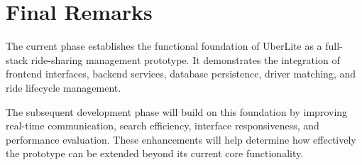 \documentclass{tietreport}
\begin{document}
\section{Final Remarks}

The current phase establishes the functional foundation
of UberLite as a full-stack ride-sharing management prototype.
It demonstrates the integration of frontend interfaces,
backend services, database persistence, driver matching,
and ride lifecycle management.

The subsequent development phase will build on this foundation
by improving real-time communication, search efficiency,
interface responsiveness, and performance evaluation.
These enhancements will help determine how effectively
the prototype can be extended beyond its current core
functionality.


\printbibliography[heading=bibintoc]
\end{document}
